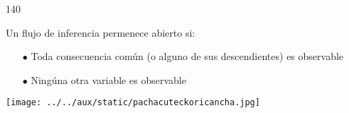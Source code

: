 \documentclass[shownotes,aspectratio=169]{beamer}
\begin{document}
\begin{frame}[plain]
{\begin{textblock}{140}
\begin{framed}
 Un flujo de inferencia permenece abierto si:
 \begin{itemize}
  \item[$\bullet$] Toda consecuencia com\'un (o alguno de sus descendientes) es observable
  \item[$\bullet$] Ning\'una otra variable es observable
 \end{itemize}
 \end{framed}

\end{textblock}

}



\end{frame}


 
\begin{frame}[plain]
\centering
  \texttt{[image: ../../aux/static/pachacuteckoricancha.jpg]}
\end{frame}
\end{document}
